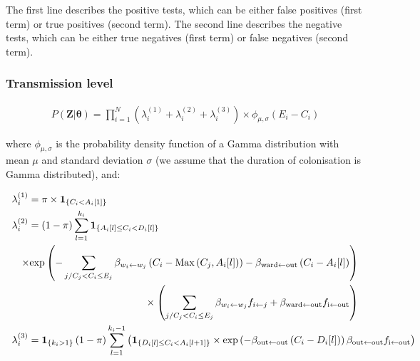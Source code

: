 \documentclass[10pt]{article}
\begin{document}
The first line describes the positive tests, which can be either false positives (first term) or true positives (second term). 
The second line describes the negative tests, which can be either true negatives (first term) or false negatives (second term). 


\subsubsection*{Transmission level} 


\begin{eqnarray*}
P\left(\bm{Z}|\bm{\theta}\right) = 
\bm{\prod}_{i=1}^N %
\left( \lambda_i^{\left(1\right)} + \lambda_i^{\left(2\right)} + \lambda_i^{\left(3\right)} \right) \times \phi_{\mu,\sigma}\left(E_i-C_i\right)
\end{eqnarray*}

\noindent where $\phi_{\mu,\sigma}$ is the probability density function of a Gamma distribution with mean $\mu$ and standard deviation $\sigma$ (we assume that the duration of colonisation is Gamma distributed), and: 

\begin{eqnarray*}
\lefteqn{\lambda_i^{\left(1\right)} = \pi \times \mathbf{1}_{\left\lbrace C_i < A_i[1] \right\rbrace} }\\
\lefteqn{\lambda_i^{\left(2\right)}  = \left( 1-\pi \right) \sum_{l=1}^{k_i} \mathbf{1}_{\left\lbrace A_i[l] \leq C_i < D_i[l] \right\rbrace}}\\
	 && \times \text{exp}\left( -\sum_{j/C_j<C_i\leq E_j} \beta_{w_i \leftarrow w_j}\left(C_i-\text{Max}\left(C_j,A_i[l]\right)\right) - \beta_{\text{ward} \leftarrow \text{out}}\left(C_i-A_i[l]\right) \right)  \\
	 && {} \times \left( \sum_{j/C_j<C_i\leq E_j} \beta_{w_i \leftarrow w_j} f_{i \leftarrow j} + \beta_{\text{ward} \leftarrow \text{out}}f_{\text{i} \leftarrow \text{out}} \right) \\
\lefteqn{\lambda_i^{\left(3\right)} = \mathbf{1}_{\left\lbrace k_i > 1 \right\rbrace} \left( 1-\pi \right) \sum_{l=1}^{k_i-1} \left( \mathbf{1}_{\left\lbrace D_i[l] \leq C_i < A_i[l+1] \right\rbrace} \times \text{exp}\left( - \beta_{\text{out} \leftarrow \text{out}}\left(C_i-D_i[l]\right) \right) \beta_{\text{out} \leftarrow \text{out}}f_{\text{i} \leftarrow \text{out}} \right) }\\
\end{eqnarray*}
\end{document}
